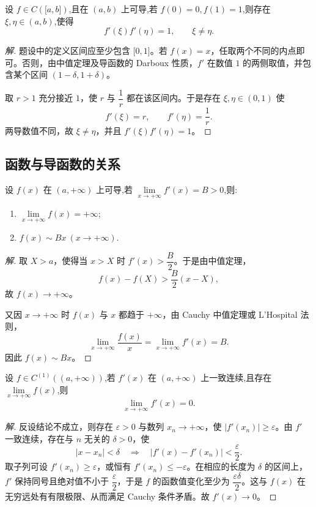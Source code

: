 \documentclass[../../数学分析培优讲义(答案版).tex]{subfiles}
\begin{document}
\begin{example}
设 $f\in C(\lbrack a,b\rbrack)$,且在 $(a,b)$ 上可导,若 $f(0)=0,f(1)=1$,则存在 $\xi,\eta\in(a,b)$,使得
\[
    f'(\xi)f'(\eta)=1,
    \qquad \xi\neq\eta.
\]
\end{example}

\begin{proof}[解]
题设中的定义区间应至少包含 $\lbrack0,1\rbrack$。若 $f(x)=x$，任取两个不同的内点即可。否则，由中值定理及导函数的 Darboux 性质，$f'$ 在数值 $1$ 的两侧取值，并包含某个区间 $(1-\delta,1+\delta)$。

取 $r>1$ 充分接近 $1$，使 $r$ 与 $\dfrac{1}{r}$ 都在该区间内。于是存在 $\xi,\eta\in(0,1)$ 使
\[
    f'(\xi)=r,
    \qquad
    f'(\eta)=\dfrac{1}{r}.
\]
两导数值不同，故 $\xi\neq\eta$，并且 $f'(\xi)f'(\eta)=1$。
\end{proof}

\subsection{函数与导函数的关系}

\begin{example}
设 $f(x)$ 在 $(a,+\infty)$ 上可导,若 $\displaystyle\lim\limits_{x\to+\infty}f'(x)=B>0$,则:
\begin{enumerate}[label=(\arabic*)]
    \item $\displaystyle\lim\limits_{x\to+\infty}f(x)=+\infty$;
    \item $f(x)\sim Bx\ (x\to+\infty)$.
\end{enumerate}
\end{example}

\begin{proof}[解]
取 $X>a$，使得当 $x>X$ 时 $f'(x)>\dfrac{B}{2}$。于是由中值定理，
\[
    f(x)-f(X)>\dfrac{B}{2}(x-X),
\]
故 $f(x)\to+\infty$。

又因 $x\to+\infty$ 时 $f(x)$ 与 $x$ 都趋于 $+\infty$，由 Cauchy 中值定理或 L'Hospital 法则，
\[
    \lim\limits_{x\to+\infty}\dfrac{f(x)}{x}
    =\lim\limits_{x\to+\infty}f'(x)=B.
\]
因此 $f(x)\sim Bx$。
\end{proof}

\begin{example}[\markstar]
设 $f\in C^{(1)}((a,+\infty))$,若 $f'(x)$ 在 $(a,+\infty)$ 上一致连续,且存在 $\displaystyle\lim\limits_{x\to+\infty}f(x)$,则
\[
    \lim\limits_{x\to+\infty}f'(x)=0.
\]
\end{example}

\begin{proof}[解]
反设结论不成立，则存在 $\varepsilon>0$ 与数列 $x_n\to+\infty$，使 $|f'(x_n)|\geq\varepsilon$。由 $f'$ 一致连续，存在与 $n$ 无关的 $\delta>0$，使
\[
    |x-x_n|<\delta
    \quad\Longrightarrow\quad
    |f'(x)-f'(x_n)|<\dfrac{\varepsilon}{2}.
\]
取子列可设 $f'(x_n)\geq\varepsilon$，或恒有 $f'(x_n)\leq-\varepsilon$。在相应的长度为 $\delta$ 的区间上，$f'$ 保持同号且绝对值不小于 $\dfrac{\varepsilon}{2}$，于是 $f$ 的函数值变化至少为 $\dfrac{\varepsilon\delta}{2}$。这与 $f(x)$ 在无穷远处有有限极限、从而满足 Cauchy 条件矛盾。故 $f'(x)\to0$。
\end{proof}
\end{document}
